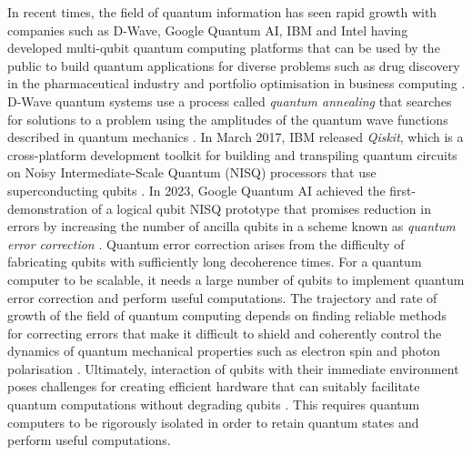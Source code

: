 In recent times, the field of quantum information has seen rapid growth with companies such as D-Wave, Google Quantum AI, IBM and Intel having developed multi-qubit quantum computing platforms that can be used by the public to build quantum applications for diverse problems such as drug discovery in the pharmaceutical industry and portfolio optimisation in business computing \cite{DWave00}. D-Wave quantum systems use a process called \textit{\gls{quantum annealing}} that searches for solutions to a problem using the amplitudes of the quantum wave functions described in quantum mechanics \cite{DWave01}. In March 2017, IBM released \textit{Qiskit}, which is a cross-platform development toolkit for building and transpiling quantum circuits on Noisy Intermediate-Scale Quantum (NISQ) processors that use superconducting qubits \cite{IBM00}. In 2023, Google Quantum AI achieved the first-demonstration of a logical qubit NISQ prototype that promises reduction in errors by increasing the number of ancilla qubits in a scheme known as \textit{quantum error correction} \cite{google2023suppressing}. Quantum error correction arises from the difficulty of fabricating qubits with sufficiently long decoherence times. For a quantum computer to be scalable, it needs a large number of qubits to implement quantum error correction and perform useful computations. The trajectory and rate of growth of the field of quantum computing depends on finding reliable methods for correcting errors that make it difficult to shield and coherently control the dynamics of quantum mechanical properties such as electron spin and photon polarisation \cite{gill2024quantum}. Ultimately, interaction of qubits with their immediate environment poses challenges for creating efficient hardware that can suitably facilitate quantum computations without degrading qubits \cite{tanaka2024single}. This requires quantum computers to be rigorously isolated in order to retain quantum states and perform useful computations. 

